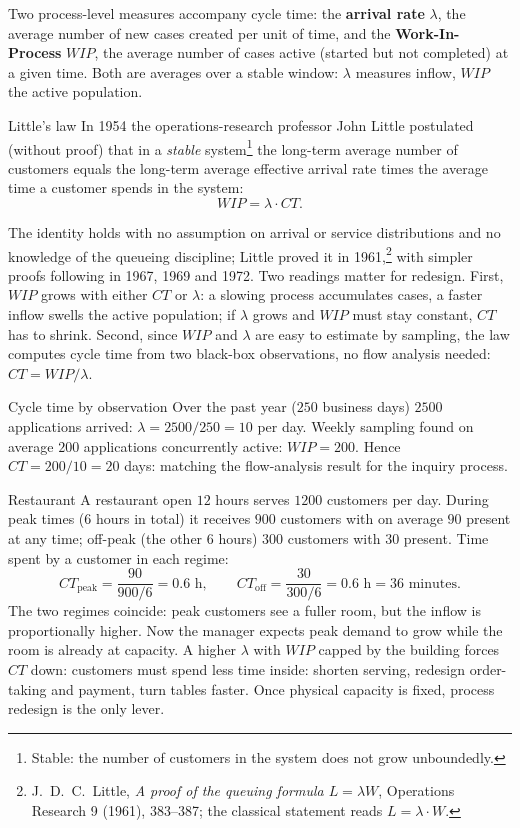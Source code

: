 Two process-level measures accompany cycle time: the \textbf{arrival rate} $\lambda$, the average number of new cases created per unit of time, and the \textbf{Work-In-Process} $WIP$, the average number of cases active (started but not completed) at a given time. Both are averages over a stable window: $\lambda$ measures inflow, $WIP$ the active population.
\begin{definitionbox}{Little's law}
In 1954 the operations-research professor John Little postulated (without proof) that in a \emph{stable} system\footnote{Stable: the number of customers in the system does not grow unboundedly.} the long-term average number of customers equals the long-term average effective arrival rate times the average time a customer spends in the system:
$$WIP = \lambda \cdot CT.$$
\end{definitionbox}
The identity holds with no assumption on arrival or service distributions and no knowledge of the queueing discipline; Little proved it in 1961,\footnote{J.~D.~C.~Little, \emph{A proof of the queuing formula $L = \lambda W$}, Operations Research 9 (1961), 383--387; the classical statement reads $L = \lambda \cdot W$.} with simpler proofs following in 1967, 1969 and 1972. Two readings matter for redesign. First, $WIP$ grows with either $CT$ or $\lambda$: a slowing process accumulates cases, a faster inflow swells the active population; if $\lambda$ grows and $WIP$ must stay constant, $CT$ has to shrink. Second, since $WIP$ and $\lambda$ are easy to estimate by sampling, the law computes cycle time from two black-box observations, no flow analysis needed: $CT = WIP / \lambda$.
\begin{examplebox}{Cycle time by observation}
Over the past year ($250$ business days) $2500$ applications arrived: $\lambda = 2500/250 = 10$ per day. Weekly sampling found on average $200$ applications concurrently active: $WIP = 200$. Hence $CT = 200/10 = 20$ days: matching the flow-analysis result for the inquiry process.
\end{examplebox}
\begin{examplebox}{Restaurant}
A restaurant open $12$ hours serves $1200$ customers per day. During peak times ($6$ hours in total) it receives $900$ customers with on average $90$ present at any time; off-peak (the other $6$ hours) $300$ customers with $30$ present. Time spent by a customer in each regime:
$$CT_{\text{peak}} = \frac{90}{900/6} = 0.6 \text{ h}, \qquad CT_{\text{off}} = \frac{30}{300/6} = 0.6 \text{ h} = 36 \text{ minutes}.$$
The two regimes coincide: peak customers see a fuller room, but the inflow is proportionally higher. Now the manager expects peak demand to grow while the room is already at capacity. A higher $\lambda$ with $WIP$ capped by the building forces $CT$ down: customers must spend less time inside: shorten serving, redesign order-taking and payment, turn tables faster. Once physical capacity is fixed, process redesign is the only lever.
\end{examplebox}

